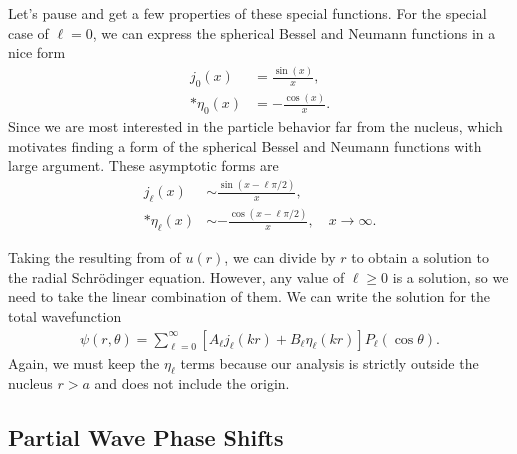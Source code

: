 Let's pause and get a few properties of these special functions. For the special case of $\ell = 0$, we can express the spherical Bessel and Neumann functions in a nice form
\begin{subequations} \label{Eq:nuclearData_sphericalBesselZerothOrder}
\begin{align} 
  j_0(x) 	&=  \frac{\sin(x)}{x} , \\*
  \eta_0(x) &= -\frac{\cos(x)}{x}.
\end{align}
\end{subequations}
Since we are most interested in the particle behavior far from the nucleus, which motivates finding a form of the spherical Bessel and Neumann functions with large argument. These asymptotic forms are
\begin{subequations} \label{Eq:nuclearData_sphericalBesselAsymptotic}
\begin{align} 
  j_\ell(x) 	&\sim  \frac{\sin(x - \ell \pi/2)}{x} , \\*
  \eta_\ell(x) 	&\sim -\frac{\cos(x - \ell \pi/2)}{x} , \quad x \rightarrow \infty.
\end{align}
\end{subequations}

Taking the resulting from of $u(r)$, we can divide by $r$ to obtain a solution to the radial Schr\"{o}dinger equation. However, any value of $\ell \ge 0$ is a solution, so we need to take the linear combination of them. We can write the solution for the total wavefunction
\begin{align} \label{Eq:nuclearData_totalWavefunctionSphericalBessel}
  \psi(r,\theta) = \sum_{\ell = 0}^\infty \left[ A_\ell j_\ell(kr) + B_\ell \eta_\ell(kr) \right] P_\ell(\cos\theta) .
\end{align}
Again, we must keep the $\eta_\ell$ terms because our analysis is strictly outside the nucleus $r > a$ and does not include the origin. 

\subsection{Partial Wave Phase Shifts}

